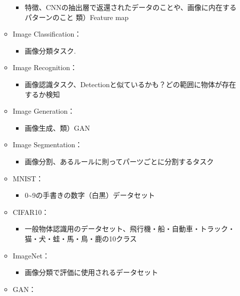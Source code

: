 \begin{itemize}
\begin{itemize}
    \begin{itemize}
    \tightlist
    \item
      特徴、CNNの抽出層で返還されたデータのことや、画像に内在するパターンのこと
      類）Feature map
    \end{itemize}
  \item
    Image Classification：

    \begin{itemize}
    \tightlist
    \item
      画像分類タスク.
    \end{itemize}
  \item
    Image Recognition：

    \begin{itemize}
    \tightlist
    \item
      画像認識タスク、Detectionと似ているかも？どの範囲に物体が存在するか検知
    \end{itemize}
  \item
    Image Generation：

    \begin{itemize}
    \tightlist
    \item
      画像生成、類）GAN
    \end{itemize}
  \item
    Image Segmentation：

    \begin{itemize}
    \tightlist
    \item
      画像分割、あるルールに則ってパーツごとに分割するタスク
    \end{itemize}
  \item
    MNIST：

    \begin{itemize}
    \tightlist
    \item
      0\textasciitilde9の手書きの数字（白黒）データセット
    \end{itemize}
  \item
    CIFAR10：

    \begin{itemize}
    \tightlist
    \item
      一般物体認識用のデータセット、飛行機・船・自動車・トラック・猫・犬・蛙・馬・鳥・鹿の10クラス
    \end{itemize}
  \item
    ImageNet：

    \begin{itemize}
    \tightlist
    \item
      画像分類で評価に使用されるデータセット
    \end{itemize}
  \item
    GAN：


\end{itemize}
\end{itemize}
